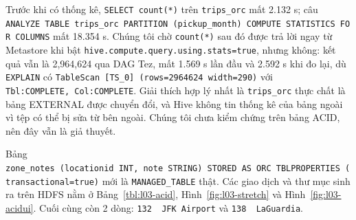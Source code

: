 \documentclass[
  12pt,
  a4paper,
]{report}
\begin{document}
Trước khi có thống kê, \texttt{SELECT\ count(*)} trên
\texttt{trips\_orc} mất 2.132 s; câu
\texttt{ANALYZE\ TABLE\ trips\_}\allowbreak{}\texttt{orc\ PARTITION\ (pickup\_}\allowbreak{}\texttt{month)\ COMPUTE\ STATISTICS\ FOR\ COLUMNS}\allowbreak{}
mất 18.354 s. Chúng tôi chờ \texttt{count(*)} sau đó được trả lời ngay
từ Metastore khi bật
\texttt{hive.}\allowbreak{}\texttt{compute.}\allowbreak{}\texttt{query.}\allowbreak{}\texttt{using.}\allowbreak{}\texttt{stats=}\allowbreak{}\texttt{true}\allowbreak{},
nhưng không: kết quả vẫn là 2,964,624 qua DAG Tez, mất 1.569 s lần đầu
và 2.592 s khi đo lại, dù \texttt{EXPLAIN} có
\texttt{TableScan\ {[}TS\_}\allowbreak{}\texttt{0{]}\ (rows=}\allowbreak{}\texttt{2964624\ width=}\allowbreak{}\texttt{290)}\allowbreak{}
với
\texttt{Tbl:}\allowbreak{}\texttt{COMPLETE,}\allowbreak{}\texttt{\ Col:}\allowbreak{}\texttt{COMPLETE}\allowbreak{}.
Giải thích hợp lý nhất là \texttt{trips\_orc} thực chất là bảng EXTERNAL
được chuyển đổi, và Hive không tin thống kê của bảng ngoài vì tệp có thể
bị sửa từ bên ngoài. Chúng tôi chưa kiểm chứng trên bảng ACID, nên đây
vẫn là giả thuyết.

Bảng
\texttt{zone\_}\allowbreak{}\texttt{notes\ (locationid\ INT,}\allowbreak{}\texttt{\ note\ STRING)\ STORED\ AS\ ORC\ TBLPROPERTIES\ (\textquotesingle{}transactional\textquotesingle{}=}\allowbreak{}\texttt{\textquotesingle{}true\textquotesingle{})}\allowbreak{}
mới là \texttt{MANAGED\_TABLE} thật. Các giao dịch và thư mục sinh ra
trên HDFS nằm ở Bảng~\ref{tbl:l03-acid}, Hình~\ref{fig:l03-stretch} và
Hình~\ref{fig:l03-acidui}. Cuối cùng còn 2 dòng:
\texttt{132\ \textbar{}\ JFK\ Airport}\allowbreak{} và
\texttt{138\ \textbar{}\ LaGuardia}.
\end{document}
